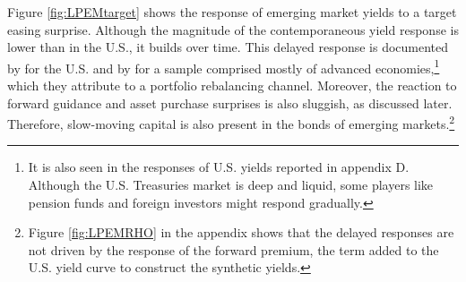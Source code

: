 {%
Figure \ref{fig:LPEMtarget} shows the response of emerging market yields to a target easing surprise.
Although the magnitude of the contemporaneous yield response %
is lower than in the U.S., it builds over time.
This delayed response is documented by \cite{BrooksKatzLustig:2019} for the U.S. and by \cite{ACDM:2019} for a sample comprised mostly of advanced economies,\footnote{ It is also seen in the responses of U.S. yields reported in appendix D. Although the U.S. Treasuries market is deep and liquid, some players like pension funds and foreign investors might respond gradually.} which they attribute to a portfolio rebalancing channel.
Moreover, the reaction to forward guidance and asset purchase surprises is also sluggish, as discussed later.
Therefore, slow-moving capital is also present in the bonds of emerging markets.\footnote{ Figure \ref{fig:LPEMRHO} in the appendix shows that the delayed responses are not driven by the response of the forward premium, the term added to the U.S. yield curve to construct the synthetic yields.} %




}
